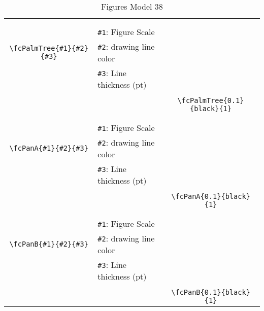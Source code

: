 \documentclass[x11names]{article}
\begin{document}
\begin{table}[H]
\begin{tabular}{|c|l|c|}
	&&\multirow{5}{*}{\fcPalmTree{0.1}{black}{1}}\\	&&\\	&\verb|#1|: Figure Scale &\\	\verb|\fcPalmTree{#1}{#2}{#3}|&	\verb|#2|: drawing line color &\\	&\verb|#3|: Line thickness (pt) &\\ &&\\&&	\verb|\fcPalmTree{0.1}{black}{1}|\\\hline 	
	&&\multirow{5}{*}{\fcPanA{0.1}{black}{1}}\\	&&\\	&\verb|#1|: Figure Scale &\\	\verb|\fcPanA{#1}{#2}{#3}|&	\verb|#2|: drawing line color &\\	&\verb|#3|: Line thickness (pt) &\\ &&\\&&	\verb|\fcPanA{0.1}{black}{1}|\\\hline 	
	&&\multirow{5}{*}{\fcPanB{0.1}{black}{1}}\\	&&\\	&\verb|#1|: Figure Scale &\\	\verb|\fcPanB{#1}{#2}{#3}|&	\verb|#2|: drawing line color &\\	&\verb|#3|: Line thickness (pt) &\\ &&\\&&	\verb|\fcPanB{0.1}{black}{1}|\\\hline 	\hline\end{tabular}\caption{Figures Model 38}\label{tab38}\end{table}
\end{document}
